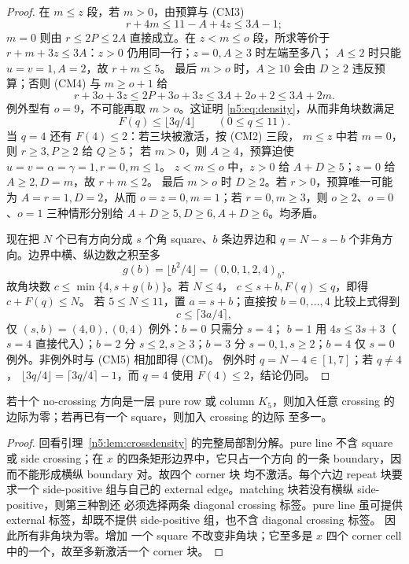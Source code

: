 \begin{proof}
在 \(m\le z\) 段，若 \(m>0\)，由预算与 (CM3)
\[
r+4m\le11-A+4z\le3A-1;
\]
\(m=0\) 则由 \(r\le2P\le2A\) 直接成立。在
\(z<m\le o\) 段，所求等价于
\(r+m+3z\le3A\)：\(z>0\) 仍用同一行；\(z=0,A\ge3\) 时左端至多八；
\(A\le2\) 时只能 \(u=v=1,A=2\)，故 \(r+m\le5\)。
最后 \(m>o\) 时，\(A\ge10\) 会由 \(D\ge2\) 违反预算；否则 (CM4)
与 \(m\ge o+1\) 给
\[
r+3o+3z\le2P+3o+3z\le3A+2o+2\le3A+2m.
\]
例外型有 \(o=9\)，不可能再取 \(m>o\)。这证明
\eqref{n5:eq:density}，从而非角块数满足
\[
F(q)\le\lfloor3q/4\rfloor\qquad(0\le q\le11).                \tag{CM5}
\]
当 \(q=4\) 还有 \(F(4)\le2\)：若三块被激活，按 (CM2) 三段，
\(m\le z\) 中若 \(m=0\)，则 \(r\ge3,P\ge2\) 给 \(Q\ge5\)；
若 \(m>0\)，则 \(A\ge4\)，预算迫使
\(u=v=\alpha=\gamma=1,r=0,m\le1\)。
\(z<m\le o\) 中，\(z>0\) 给 \(A+D\ge5\)；\(z=0\) 给
\(A\ge2,D=m\)，故 \(r+m\le2\)。
最后 \(m>o\) 时 \(D\ge2\)。若 \(r>0\)，预算唯一可能为
\(A=r=1,D=2\)，从而 \(o=z=0,m=1\)；若 \(r=0,m\ge3\)，则
\(o\ge2\)、\(o=0\)、\(o=1\) 三种情形分别给
\(A+D\ge5,D\ge6,A+D\ge6\)。均矛盾。

现在把 \(N\) 个已有方向分成 \(s\) 个角 square、\(b\) 条边界边和
\(q=N-s-b\) 个非角方向。边界中横、纵边数之积至多
\[
g(b)=\lfloor b^2/4\rfloor=(0,0,1,2,4)_b,
\]
故角块数 \(c\le\min\{4,s+g(b)\}\)。若 \(N\le4\)，
\(c\le s+b,F(q)\le q\)，即得 \(c+F(q)\le N\)。
若 \(5\le N\le11\)，置 \(a=s+b\)；直接按 \(b=0,\ldots,4\)
比较上式得到
\[
c\le\lceil3a/4\rceil,
\]
仅 \((s,b)=(4,0),(0,4)\) 例外：\(b=0\) 只需分 \(s=4\)；
\(b=1\) 用 \(4s\le3s+3\)（\(s=4\) 直接代入）；\(b=2\) 分
\(s\le2,s\ge3\)；\(b=3\) 分 \(s=0,1,s\ge2\)；\(b=4\) 仅
\(s=0\) 例外。非例外时与 (CM5) 相加即得 (CM)。
例外时 \(q=N-4\in[1,7]\)；若 \(q\ne4\)，
\(\lfloor3q/4\rfloor=\lceil3q/4\rceil-1\)，而 \(q=4\) 使用
\(F(4)\le2\)，结论仍同。
\end{proof}

\begin{corollary}\label{n5:cor:full-line}
若十个 no-crossing 方向是一层 pure row 或 column \(K_5\)，则加入任意
crossing 的边际为零；若再已有一个 square，则加入 crossing 的边际
至多一。
\end{corollary}

\begin{proof}
回看引理~\ref{n5:lem:crossdensity} 的完整局部割分解。pure line 不含
square 或 side crossing；在 \(x\) 的四条矩形边界中，它只占一个方向
的一条 boundary，因而不能形成横纵 boundary 对。故四个 corner 块
均不激活。每个六边 repeat 块要求一个 side-positive 组与自己的
external edge。matching 块若没有横纵 side-positive，则第三种割还
必须选择两条 diagonal crossing 标签。pure line 虽可提供 external
标签，却既不提供 side-positive 组，也不含 diagonal crossing 标签。
因此所有非角块为零。增加
一个 square 不改变非角块；它至多是 \(x\)
四个 corner cell 中的一个，故至多新激活一个 corner 块。
\end{proof}

